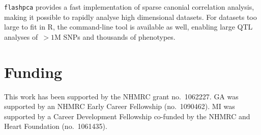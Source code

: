 \documentclass{bioinfo}
\begin{document}
\texttt{flashpca} provides a fast implementation of sparse canonial correlation
analysis, making it possible to rapidly analyse high dimensional datasets.
For datasets too large to fit in \textsf{R}, the command-line tool is
available as well, enabling large QTL analyses of~${>}1$M SNPs and thousands
of phenotypes.



\vspace*{-12pt}
\section*{Funding}

This work has been supported by the NHMRC grant no.~1062227. GA was supported by
an NHMRC Early Career Fellowship (no.~1090462). MI was supported by a Career
Development Fellowship co-funded by the NHMRC and Heart Foundation
(no.~1061435).

\vspace*{-12pt}




%
%
%
%
%
%
%
\end{document}
